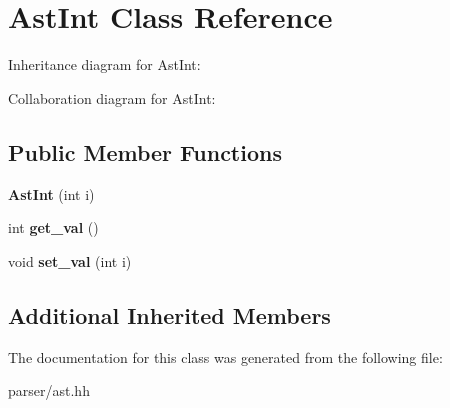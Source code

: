 \hypertarget{classAstInt}{}\section{Ast\+Int Class Reference}
\label{classAstInt}


Inheritance diagram for Ast\+Int\+:


Collaboration diagram for Ast\+Int\+:
\subsection*{Public Member Functions}
\begin{DoxyCompactItemize}
\item 
\mbox{\label{classAstInt_a6ec1194dfb79f623c49055241cb87764}} 
{\bfseries Ast\+Int} (int i)
\item 
\mbox{\label{classAstInt_ac50fc299d1c570671d38a6466b692209}} 
int {\bfseries get\+\_\+val} ()
\item 
\mbox{\label{classAstInt_a3b3c9cbb2ebc03300e3b8f8c776d11c3}} 
void {\bfseries set\+\_\+val} (int i)
\end{DoxyCompactItemize}
\subsection*{Additional Inherited Members}


The documentation for this class was generated from the following file\+:\begin{DoxyCompactItemize}
\item 
parser/ast.\+hh\end{DoxyCompactItemize}
